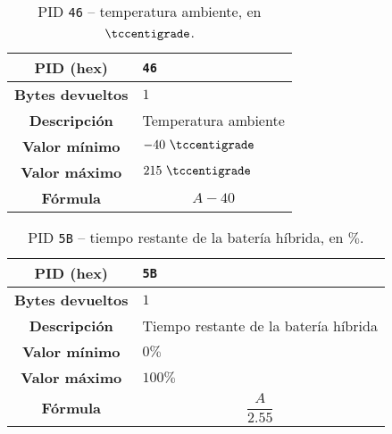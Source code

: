 \begin{table}[H]
  \centering
  \begin{tabularx}{\textwidth}{|c|X|}
    \hline
    \textbf{PID (hex)}       & \texttt{46}                    \\
    \hline
    \textbf{Bytes devueltos} & $1$                            \\
    \hline
    \textbf{Descripción}     & Temperatura ambiente \\
    \hline
    \textbf{Valor mínimo}    & $-40~\tccentigrade$                          \\
    \hline
    \textbf{Valor máximo}    & $215~\tccentigrade$                        \\
    \hline
    \textbf{Fórmula}         &                                %
    \begin{equation*}
      A - 40
    \end{equation*}                                 \\
    \hline
  \end{tabularx}
  \caption{\ac{PID} \texttt{46} -- temperatura ambiente, en $\tccentigrade$.}
\end{table}

\begin{table}[H]
  \centering
  \begin{tabularx}{\textwidth}{|c|X|}
    \hline
    \textbf{PID (hex)}       & \texttt{5B}                    \\
    \hline
    \textbf{Bytes devueltos} & $1$                            \\
    \hline
    \textbf{Descripción}     & Tiempo restante de la batería híbrida \\
    \hline
    \textbf{Valor mínimo}    & $0\%$                          \\
    \hline
    \textbf{Valor máximo}    & $100\%$                        \\
    \hline
    \textbf{Fórmula}         &                                %
    \begin{equation*}
      \frac{A}{2.55}
    \end{equation*}                                 \\
    \hline
  \end{tabularx}
  \caption{\ac{PID} \texttt{5B} -- tiempo restante de la batería híbrida, en $\%$.}
\end{table}

